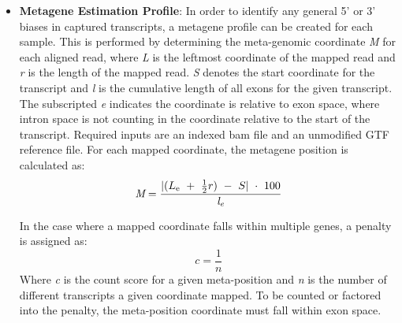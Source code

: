 \documentclass[11pt, a4paper, oneside]{article}
\begin{document}
\begin{enumerate}
\begin{itemize}
      \item \textbf{Metagene Estimation Profile}: In order to identify any general 5' or 3' biases in captured transcripts, a metagene profile can be created for each sample. This is performed by determining the meta-genomic coordinate \textit{M} for each aligned read, where \textit{L} is the leftmost coordinate of the mapped read and \textit{r} is the length of the mapped read. \textit{S} denotes the start coordinate for the transcript and \textit{l} is the cumulative length of all exons for the given transcript. The subscripted \textit{e} indicates the coordinate is relative to exon space, where intron space is not counting in the coordinate relative to the start of the transcript. Required inputs are an indexed bam file and an unmodified GTF reference file. For each mapped coordinate, the metagene position is calculated as:
      \begin{equation}
      \textit{M} = \frac{|(L\textsubscript{e}\ +\ \frac{1}{2}r)\ -\ S|\ \cdot\ 100}{\textit{l\textsubscript{e}}}
      \end{equation}

      In the case where a mapped coordinate falls within multiple genes, a penalty is assigned as:
      \begin{equation}
        \textit{c} = \frac{1}{\textit{n}}
      \end{equation}
      Where \textit{c} is the count score for a given meta-position and \textit{n} is the number of different transcripts a given coordinate mapped. To be counted or factored into the penalty, the meta-position coordinate must fall within exon space.


\end{itemize}
\end{enumerate}
\end{document}
